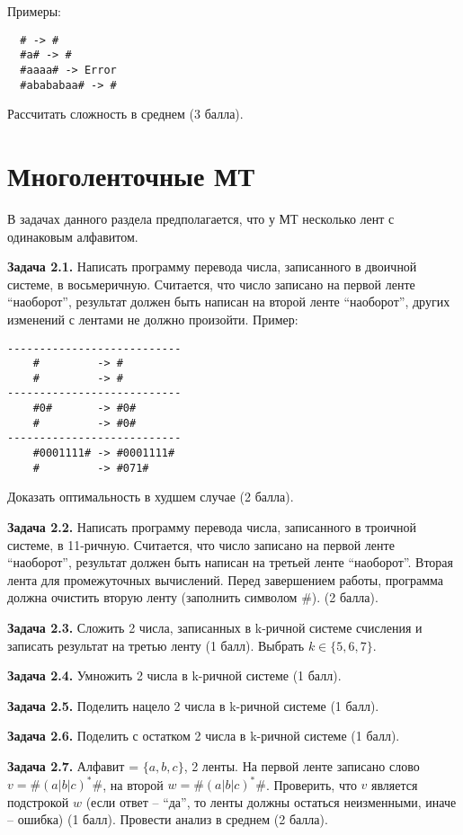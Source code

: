 \documentclass[a4paper, 10pt]{extarticle}
\newcommand{\Task}[1]{\textbf{Задача #1.}}
\begin{document}
Примеры:
\begin{verbatim}
  # -> #
  #a# -> #
  #aaaa# -> Error
  #abababaa# -> #
\end{verbatim}

Рассчитать сложность в среднем (3 балла).

\newpage
\section{Многоленточные МТ}
В задачах данного раздела предполагается, что у МТ несколько лент с одинаковым алфавитом.

\Task{2.1} Написать программу перевода числа, записанного в двоичной системе, в восьмеричную. Считается, что число записано 
на первой ленте ``наоборот'', результат должен быть написан на второй ленте ``наоборот'', других изменений с лентами не должно произойти. 
Пример:
\begin{verbatim}
---------------------------
    #         -> #
    #         -> #
---------------------------
    #0#       -> #0#
    #         -> #0#
---------------------------
    #0001111# -> #0001111#
    #         -> #071# 
\end{verbatim}

Доказать оптимальность в худшем случае (2 балла).    

\Task{2.2} Написать программу перевода числа, записанного в троичной системе, в 11-ричную. Считается, что число записано на 
первой ленте ``наоборот'',  результат должен быть написан на третьей ленте ``наоборот''. Вторая лента для 
промежуточных вычислений. Перед завершением работы, программа должна очистить вторую ленту (заполнить символом $\#$). (2 балла).

\Task{2.3} Сложить 2 числа, записанных в k-ричной системе счисления и записать результат на третью ленту (1 балл). 
Выбрать $k \in \{5, 6, 7\}$.

\Task{2.4} Умножить 2 числа в k-ричной системе (1 балл).

\Task{2.5} Поделить нацело 2 числа в k-ричной системе (1 балл).

\Task{2.6} Поделить с остатком 2 числа в k-ричной системе (1 балл).

\Task{2.7} Алфавит = $\{a, b, c\}$, 2 ленты. На первой ленте записано слово $v = \#(a|b|c)^*\#$, на второй  $w = \#(a|b|c)^*\#$. 
Проверить, что $v$ является подстрокой $w$ (если ответ -- ``да'', то ленты должны остаться неизменными, иначе -- ошибка) (1 балл). 
Провести анализ в среднем (2 балла).
\end{document}
